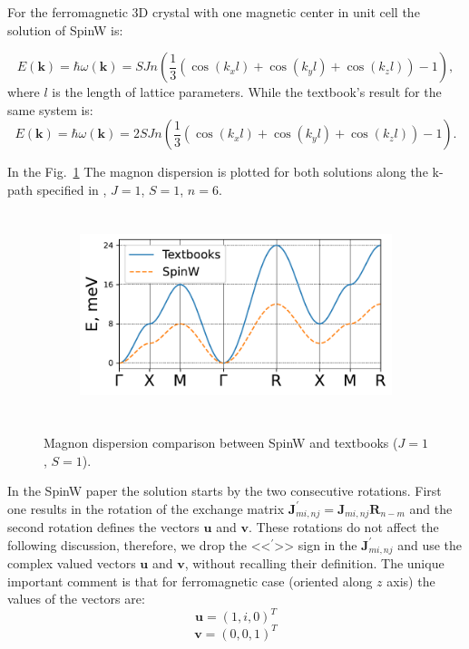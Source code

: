 \documentclass[a4paper,12pt]{article}
\begin{document}
        For the ferromagnetic 3D crystal with one magnetic center in unit cell the solution of SpinW is:

        \begin{equation}
            E(\boldsymbol{k}) = \hbar\omega(\boldsymbol{k}) = SJn\left(\dfrac{1}{3}\left(\cos(k_xl) + \cos(k_yl) + \cos(k_zl)\right) - 1\right),
        \end{equation}
        where $l$ is the length of lattice parameters. While the textbook's result for the same system is:
        \begin{equation}
            E(\boldsymbol{k}) = \hbar\omega(\boldsymbol{k}) = 2SJn\left(\dfrac{1}{3}\left(\cos(k_xl) + \cos(k_yl) + \cos(k_zl)\right) - 1\right). \label{eq:textbook}
        \end{equation}

        In the Fig.~\ref{fig:dispersion-comparasion} The magnon dispersion is plotted for both solutions along the k-path specified in \cite{setyawan2010high}, $J = 1$, $S = 1$, $n = 6$.

        \begin{figure}[H]
            \centering
            \begin{subfigure}[b]{0.8\textwidth}
                \centering
                \includegraphics[height=6cm]{main_dispersion.pdf}
            \end{subfigure}
            \hfill
            \caption{Magnon dispersion comparison between SpinW and textbooks ($J = 1$, $S = 1$).}
            \label{fig:dispersion-comparasion}
        \end{figure}

        In the SpinW paper \cite{toth2015linear} the solution starts by the two consecutive rotations.
        First one results in the rotation of the exchange matrix $\boldsymbol{J}^{\prime}_{mi, nj} = \boldsymbol{J}_{mi, nj}\boldsymbol{R}_{n-m}$ 
        and the second rotation defines the vectors $\boldsymbol{u}$ and $\boldsymbol{v}$.
        These rotations do not affect the following discussion, therefore, we drop the <<$^{\prime}$>> sign in the $\boldsymbol{J}^{\prime}_{mi, nj}$ 
        and use the complex valued vectors $\boldsymbol{u}$ and $\boldsymbol{v}$, without recalling their definition. 
        The unique important comment is that for ferromagnetic case (oriented along $z$ axis) the values of the vectors are:
        \begin{equation}
            \boldsymbol{u} = (1, i, 0)^T
        \end{equation}
        \begin{equation}
            \boldsymbol{v} = (0, 0, 1)^T
        \end{equation}
\end{document}
